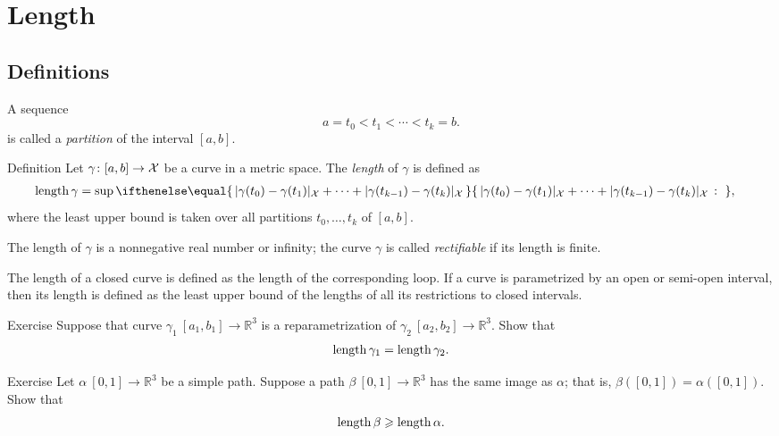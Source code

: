 \chapter{Length}
\label{chap:length}

\section{Definitions}

A sequence 
\[a=t_0 < t_1 < \cdots < t_k=b.\]
is called a \emph{partition} of the interval $[a,b]$.

\begin{thm}{Definition}\label{def:length}
Let $\gamma\colon[a,b]\to \mathcal{X}$ be a curve in a metric space.
The \emph{length} of $\gamma$ is defined as
\begin{align*}
\length \gamma
&= 
\sup
\set{\dist{\gamma(t_0)}{\gamma(t_1)}{\spc{X}}
+\dots+
\dist{\gamma(t_{k-1})}{\gamma(t_k)}{\spc{X}}}{},
\end{align*}
where the least upper bound is taken over all partitions $t_0,\dots,t_k$ of $[a,b]$.

The length of $\gamma$ is a nonnegative real number or infinity;
the curve $\gamma$ is called \emph{rectifiable} if its length is finite. 

The length of a closed curve is defined as the length of the corresponding loop.
If a curve is parametrized by an open or semi-open interval, then its length is defined as the least upper bound of the lengths of all its restrictions to closed intervals.
\end{thm}


\begin{thm}{Exercise}\label{ex:integral-length-0}
Suppose that curve $\gamma_1\:[a_1,b_1] \to\mathbb{R}^3$ is a reparametrization of $\gamma_2\:[a_2,b_2] \to\mathbb{R}^3$. 
Show that
\[\mathop{\rm length}\nolimits \gamma_1 = \mathop{\rm length}\nolimits \gamma_2.\]

\end{thm}


\begin{thm}{Exercise}\label{ex:length-image}
Let $\alpha\:[0,1]\to\mathbb{R}^3$ be a simple path.
Suppose a path $\beta\:[0,1]\to\mathbb{R}^3$ has the same image as $\alpha$;
that is, $\beta([0,1])=\alpha([0,1])$.
Show that 
\[\mathop{\rm length}\nolimits \beta\geqslant \mathop{\rm length}\nolimits \alpha.\]

\end{thm}

